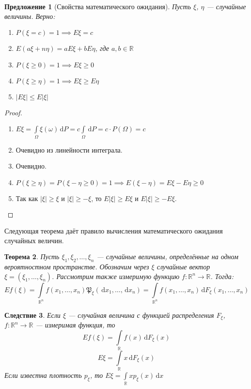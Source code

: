 \documentclass[11pt,openany,a4paper]{scrartcl}
\theoremstyle{plain}
\newtheorem{theorem}{Теорема}[subsection]
\newtheorem{corollary}[theorem]{Следствие}
\newtheorem{proposition}[theorem]{Предложение}
\theoremstyle{definition}
\newcommand\mb{\mathbb}
\newcommand\real{\mb R}
\newcommand{\dif}{\, \mathrm d}
\begin{document}
\begin{proposition}[Свойства математического ожидания]
Пусть $\xi$, $\eta$ — случайные величины. Верно:
    \begin{enumerate}
        \item $P(\xi = c) = 1 \implies E\xi = c$
        \item $E(a\xi + n\eta) = aE\xi + bE\eta$, где $a,b \in \real$
        \item $P(\xi \geqslant 0) = 1 \implies E\xi \geqslant 0$
        \item $P(\xi \geqslant \eta) = 1 \implies E\xi \geqslant E\eta$
        \item $|E\xi| \leqslant E|\xi|$
    \end{enumerate}
\end{proposition}
\begin{proof}
\mbox{}
    \begin{enumerate}
        \item $E\xi = \int\limits_\Omega\xi(\omega)\dif P =
        c\int\limits_\Omega \dif P = c\cdot P(\Omega) = c$
        \item Очевидно из линейности интеграла.
        \item Очевидно.
        \item $P(\xi \geqslant \eta) = P(\xi - \eta \geqslant 0) = 1 \implies
        E(\xi - \eta) = E\xi - E\eta \geqslant 0$
        \item Так как $|\xi| \geqslant \xi$ и $|\xi| \geqslant - \xi$, то
        $E|\xi| \geqslant E\xi$ и $E|\xi| \geqslant - E\xi$.
    \end{enumerate}
\end{proof}

Следующая теорема даёт правило вычисления математического ожидания случайных
величин.

\begin{theorem}
    Пусть $\xi_1, \xi_2, \ldots, \xi_n$ — случайные величины, определённые на
    одном вероятностном пространстве. Обозначим через $\xi$ случайные вектор
    $\xi = (\xi_1, \ldots, \xi_n)$. Рассмотрим также измеримую функцию
    $f: \real^n \to \real$. Тогда:
    $$
    Ef(\xi) = \int\limits_{\real^n} f(x_1, \ldots, x_n)
    \mathfrak P_\xi (\dif x_1, \ldots, \dif x_n) =
    \int\limits_{\real^n} f(x_1, \ldots, x_n) \dif F_\xi(x_1, \ldots, x_n)
    $$
\end{theorem}
\begin{corollary}
    Если $\xi$ — случайная величина с функцией распределения $F_\xi$,
    $f: \real^n \to \real$ — измеримая функция, то
    $$
    Ef(\xi) = \int\limits_\real f(x) \dif F_\xi(x)
    $$
    $$
    E\xi = \int\limits_\real x \dif F_\xi(x)
    $$
    Если известна плотность $p_\xi$, то $E\xi = \int\limits_\real xp_\xi(x)\dif x$
\end{corollary}
\end{document}
